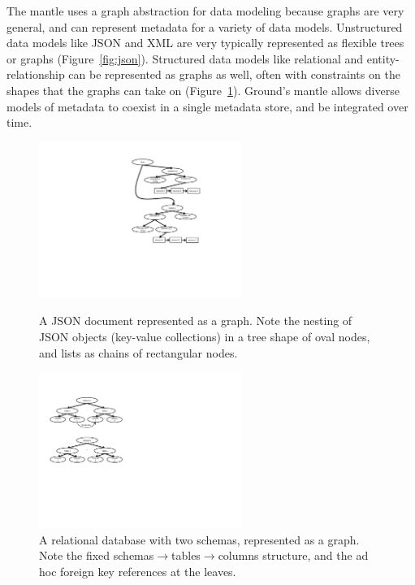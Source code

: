 \documentclass{article}
\newcommand{\mantle}{mantle\xspace}
\begin{document}
The \mantle uses a graph abstraction for data modeling because graphs are very general, and can represent metadata for a variety of 
data models.  Unstructured data models like JSON and XML 
are very typically represented as flexible trees or graphs (Figure~\ref{fig:json}).  
Structured data models like relational and entity-relationship can be represented as graphs as well, often
with constraints on the shapes that the graphs can take on (Figure~\ref{fig:relational}).  Ground's \mantle allows diverse models
of metadata to coexist in a single metadata store, and be integrated over time.
\begin{figure}[ht]
\centering
\begin{minipage}{0.4\textwidth}
\includegraphics[height=2in]{json.pdf}
\caption{A JSON document represented as a graph.  Note the nesting of JSON objects (key-value collections) in a tree shape of oval nodes, and lists as chains of rectangular nodes.}
\label{fig:json}
\end{minipage}
\hspace{0.1\textwidth}
\begin{minipage}{0.4\textwidth}
\includegraphics[height=2in]{relational.pdf}
\caption{A relational database with two schemas, represented as a graph.  Note the fixed schemas$\rightarrow$tables$\rightarrow$columns structure, and
the ad hoc foreign key references at the leaves.}
\label{fig:relational}
\end{minipage}
\end{figure}
\end{document}
